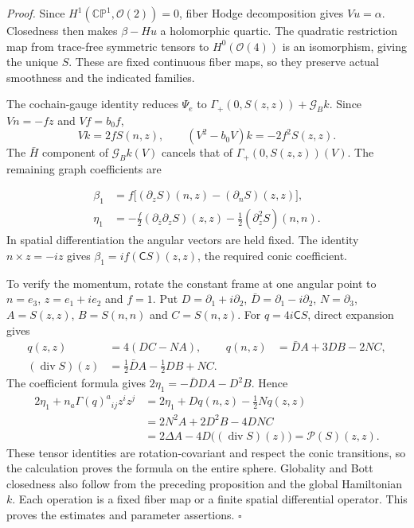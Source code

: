 \documentclass[
  english,
  11pt,
  reqno]{amsart}
\begin{document}
\emph{Proof.} Since \(H^1(\mathbb{CP}^1,\mathcal O(2))=0\), fiber Hodge
decomposition gives \(Vu=\alpha\). Closedness then makes \(\beta-Hu\) a
holomorphic quartic. The quadratic restriction map from trace-free
symmetric tensors to \(H^0(\mathcal O(4))\) is an isomorphism, giving
the unique \(S\). These are fixed continuous fiber maps, so they
preserve actual smoothness and the indicated families.

The cochain-gauge identity reduces \(\Psi_e\) to
\(\Gamma_+(0,S(z,z))+\mathcal G_Bk\). Since \(Vn=-fz\) and \(Vf=b_0f\),
\[
Vk=2fS(n,z),\qquad
(V^2-b_0V)k=-2f^2S(z,z).
\] The \(\bar H\) component of \(\mathcal G_Bk(V)\) cancels that of
\(\Gamma_+(0,S(z,z))(V)\). The remaining graph coefficients are

\label{eq:online-positive-normalized-graph-coefficients}
\[
\begin{aligned}
\beta_1&=f\bigl[(\partial_zS)(n,z)-(\partial_nS)(z,z)\bigr],\\
\eta_1&=-\frac f2(\partial_{\bar z}\partial_zS)(z,z)
        -\frac12(\partial_z^2S)(n,n).
\end{aligned}
\] In spatial differentiation the angular vectors are held fixed. The
identity \(n\times z=-iz\) gives \(\beta_1=if(\mathsf CS)(z,z)\), the
required conic coefficient.

To verify the momentum, rotate the constant frame at one angular point
to \(n=e_3\), \(z=e_1+ie_2\) and \(f=1\). Put
\(D=\partial_1+i\partial_2\), \(\bar D=\partial_1-i\partial_2\),
\(N=\partial_3\), \(A=S(z,z)\), \(B=S(n,n)\) and \(C=S(n,z)\). For
\(q=4i\mathsf CS\), direct expansion gives \[
\begin{aligned}
q(z,z)&=4(DC-NA),&
q(n,z)&=\bar DA+3DB-2NC,\\
(\operatorname{div}S)(z)&=\tfrac12\bar DA-\tfrac12DB+NC.
\end{aligned}
\] The coefficient formula gives \(2\eta_1=-\bar DDA-D^2B\). Hence \[
\begin{aligned}
2\eta_1+n_a\Gamma(q)^a{}_{ij}z^iz^j
&=2\eta_1+Dq(n,z)-\tfrac12Nq(z,z)\\
&=2N^2A+2D^2B-4DNC\\
&=2\Delta A-4D\bigl((\operatorname{div}S)(z)\bigr)
=\mathcal P(S)(z,z).
\end{aligned}
\] These tensor identities are rotation-covariant and respect the conic
transitions, so the calculation proves the formula on the entire sphere.
Globality and Bott closedness also follow from the preceding proposition
and the global Hamiltonian \(k\). Each operation is a fixed fiber map or
a finite spatial differential operator. This proves the estimates and
parameter assertions. \hfill\(\square\)
\end{document}
